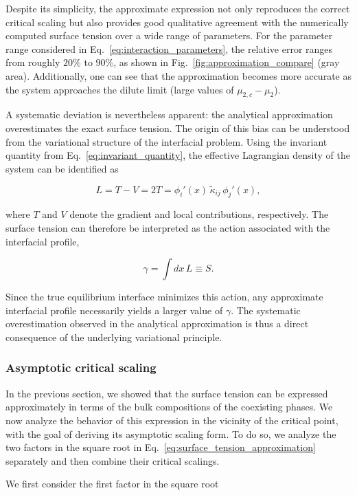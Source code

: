 \documentclass[12pt]{article}
\begin{document}
Despite its simplicity, the approximate expression not only reproduces the correct
critical scaling but also provides good qualitative agreement with the numerically
computed surface tension over a wide range of parameters.
For the parameter range considered in Eq.~\eqref{eq:interaction_parameters}, the relative error ranges from roughly \(20\%\) to \(90\%\),
as shown in Fig.~\ref{fig:approximation_compare} (gray area).
Additionally, one can see that the approximation becomes more accurate as the system approaches the dilute limit (large values of \(\mu_{2,c}-\mu_2\)).

A systematic deviation is nevertheless apparent: the analytical approximation
overestimates the exact surface tension. The origin of this bias can be understood
from the variational structure of the interfacial problem.
Using the invariant quantity from Eq.~\eqref{eq:invariant_quantity}, the effective
Lagrangian density of the system can be identified as

\[
    L = T - V = 2T =  \phi_i'(x) \,\tilde\kappa_{ij}\,  \phi_j'(x),
\]


where $T$ and $V$ denote the gradient and local contributions, respectively. The
surface tension can therefore be interpreted as the action associated with the
interfacial profile,

\[
    \gamma = \int dx\, L \equiv S.
\]

Since the true equilibrium interface minimizes this action, any approximate
interfacial profile necessarily yields a larger value of $\gamma$. The systematic
overestimation observed in the analytical approximation is thus a direct
consequence of the underlying variational principle.



\subsubsection{Asymptotic critical scaling}

In the previous section, we showed that the surface tension can be expressed
approximately in terms of the bulk compositions of the coexisting phases. We now
analyze the behavior of this expression in the vicinity of the critical point, with
the goal of deriving its asymptotic scaling form.
To do so, we analyze the two factors in the square root in Eq.~\eqref{eq:surface_tension_approximation} separately and then combine their critical scalings.

We first consider the first factor in the square root
\end{document}
